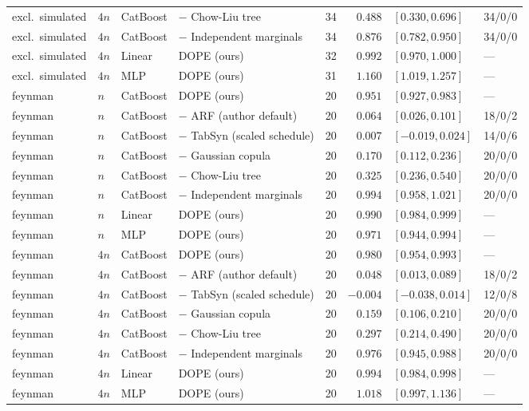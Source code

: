\begin{longtable}{lllllrll}
excl.\ simulated & $4n$ & CatBoost & $-$ Chow-Liu tree & 34 & $0.488$ & $[0.330, 0.696]$ & 34/0/0 \\
excl.\ simulated & $4n$ & CatBoost & $-$ Independent marginals & 34 & $0.876$ & $[0.782, 0.950]$ & 34/0/0 \\
excl.\ simulated & $4n$ & Linear & DOPE (ours) & 32 & $0.992$ & $[0.970, 1.000]$ & --- \\
excl.\ simulated & $4n$ & MLP & DOPE (ours) & 31 & $1.160$ & $[1.019, 1.257]$ & --- \\
feynman & $n$ & CatBoost & DOPE (ours) & 20 & $0.951$ & $[0.927, 0.983]$ & --- \\
feynman & $n$ & CatBoost & $-$ ARF (author default) & 20 & $0.064$ & $[0.026, 0.101]$ & 18/0/2 \\
feynman & $n$ & CatBoost & $-$ TabSyn (scaled schedule) & 20 & $0.007$ & $[-0.019, 0.024]$ & 14/0/6 \\
feynman & $n$ & CatBoost & $-$ Gaussian copula & 20 & $0.170$ & $[0.112, 0.236]$ & 20/0/0 \\
feynman & $n$ & CatBoost & $-$ Chow-Liu tree & 20 & $0.325$ & $[0.236, 0.540]$ & 20/0/0 \\
feynman & $n$ & CatBoost & $-$ Independent marginals & 20 & $0.994$ & $[0.958, 1.021]$ & 20/0/0 \\
feynman & $n$ & Linear & DOPE (ours) & 20 & $0.990$ & $[0.984, 0.999]$ & --- \\
feynman & $n$ & MLP & DOPE (ours) & 20 & $0.971$ & $[0.944, 0.994]$ & --- \\
feynman & $4n$ & CatBoost & DOPE (ours) & 20 & $0.980$ & $[0.954, 0.993]$ & --- \\
feynman & $4n$ & CatBoost & $-$ ARF (author default) & 20 & $0.048$ & $[0.013, 0.089]$ & 18/0/2 \\
feynman & $4n$ & CatBoost & $-$ TabSyn (scaled schedule) & 20 & $-0.004$ & $[-0.038, 0.014]$ & 12/0/8 \\
feynman & $4n$ & CatBoost & $-$ Gaussian copula & 20 & $0.159$ & $[0.106, 0.210]$ & 20/0/0 \\
feynman & $4n$ & CatBoost & $-$ Chow-Liu tree & 20 & $0.297$ & $[0.214, 0.490]$ & 20/0/0 \\
feynman & $4n$ & CatBoost & $-$ Independent marginals & 20 & $0.976$ & $[0.945, 0.988]$ & 20/0/0 \\
feynman & $4n$ & Linear & DOPE (ours) & 20 & $0.994$ & $[0.984, 0.998]$ & --- \\
feynman & $4n$ & MLP & DOPE (ours) & 20 & $1.018$ & $[0.997, 1.136]$ & --- \\

\end{longtable}
